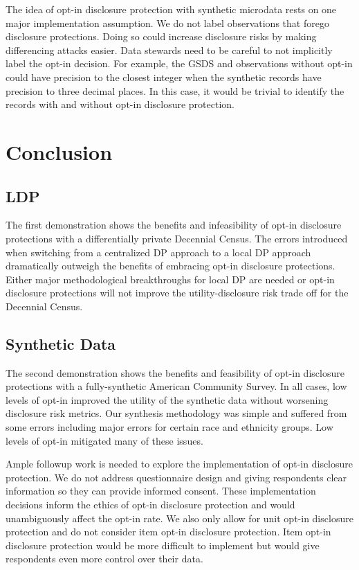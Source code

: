\documentclass[
]{urban-formatting}
\begin{document}
The idea of opt-in disclosure protection with synthetic microdata rests
on one major implementation assumption. We do not label observations
that forego disclosure protections. Doing so could increase disclosure
risks by making differencing attacks easier. Data stewards need to be
careful to not implicitly label the opt-in decision. For example, the
GSDS and observations without opt-in could have precision to the closest
integer when the synthetic records have precision to three decimal
places. In this case, it would be trivial to identify the records with
and without opt-in disclosure protection.

\section{Conclusion}

\hypertarget{ldp}{%
\subsection{LDP}\label{ldp}}

The first demonstration shows the benefits and infeasibility of opt-in
disclosure protections with a differentially private Decennial Census.
The errors introduced when switching from a centralized DP approach to a
local DP approach dramatically outweigh the benefits of embracing opt-in
disclosure protections. Either major methodological breakthroughs for
local DP are needed or opt-in disclosure protections will not improve
the utility-disclosure risk trade off for the Decennial Census.

\hypertarget{synthetic-data}{%
\subsection{Synthetic Data}\label{synthetic-data}}

The second demonstration shows the benefits and feasibility of opt-in
disclosure protections with a fully-synthetic American Community Survey.
In all cases, low levels of opt-in improved the utility of the synthetic
data without worsening disclosure risk metrics. Our synthesis
methodology was simple and suffered from some errors including major
errors for certain race and ethnicity groups. Low levels of opt-in
mitigated many of these issues.

Ample followup work is needed to explore the implementation of opt-in
disclosure protection. We do not address questionnaire design and giving
respondents clear information so they can provide informed consent.
These implementation decisions inform the ethics of opt-in disclosure
protection and would unambiguously affect the opt-in rate. We also only
allow for unit opt-in disclosure protection and do not consider item
opt-in disclosure protection. Item opt-in disclosure protection would be
more difficult to implement but would give respondents even more control
over their data.
\end{document}
